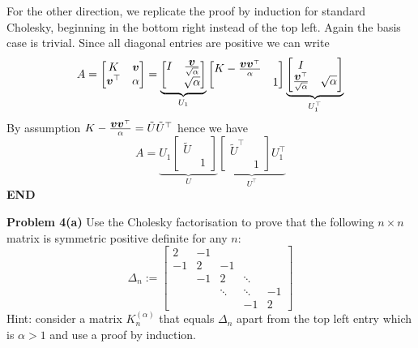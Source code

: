 \documentclass[12pt,a4paper]{article}
\def\v{ {\vc v} }
\def\Ut{ {\tilde U} }
\begin{document}
For the other direction, we replicate the proof by induction for standard Cholesky, beginning in the bottom right instead of the top left. Again the basis case is trivial. Since all diagonal entries are positive we can write
\[
A = \begin{bmatrix} K & \ensuremath{\bm{\v}}\\
                    \ensuremath{\bm{\v}}^\ensuremath{\top} & \ensuremath{\alpha} \end{bmatrix} =
                    \underbrace{\begin{bmatrix} I & {\ensuremath{\bm{\v}} \over \sqrt{\ensuremath{\alpha}}} \\
                                        & \sqrt{\ensuremath{\alpha}}
                                        \end{bmatrix}}_{U_1}
                    \begin{bmatrix} K - {\ensuremath{\bm{\v}} \ensuremath{\bm{\v}}^\ensuremath{\top} \over \ensuremath{\alpha}}  & \\
                     & 1 \end{bmatrix}
                     \underbrace{\begin{bmatrix} I \\
                      {\ensuremath{\bm{\v}}^\ensuremath{\top} \over \sqrt{\ensuremath{\alpha}}} & \sqrt{\ensuremath{\alpha}}
                                        \end{bmatrix}}_{U_1^\ensuremath{\top}}
\]
By assumption $K - {\ensuremath{\bm{\v}} \ensuremath{\bm{\v}}^\ensuremath{\top} \over \ensuremath{\alpha}} = \Ut\Ut^\ensuremath{\top}$ hence we have
\[
A = \underbrace{U_1 \begin{bmatrix} \Ut \\ & 1 \end{bmatrix}}_U  \underbrace{\begin{bmatrix} \Ut^\top \\ & 1 \end{bmatrix} U_1^\top}_{U^\top}
\]
\textbf{END}

\textbf{Problem 4(a)} Use the Cholesky factorisation to prove that the following $n \ensuremath{\times} n$ matrix is symmetric positive definite for any $n$:
\[
\ensuremath{\Delta}_n := \begin{bmatrix}
2 & -1 \\
-1 & 2 & -1 \\
& -1 & 2 & \ensuremath{\ddots} \\
&& \ensuremath{\ddots} & \ensuremath{\ddots} & -1 \\
&&& -1 & 2
\end{bmatrix}
\]
Hint: consider a matrix $K_n^{(\ensuremath{\alpha})}$ that equals $\ensuremath{\Delta}_n$ apart from the top left entry which is $\ensuremath{\alpha} > 1$ and use a proof by induction.
\end{document}
